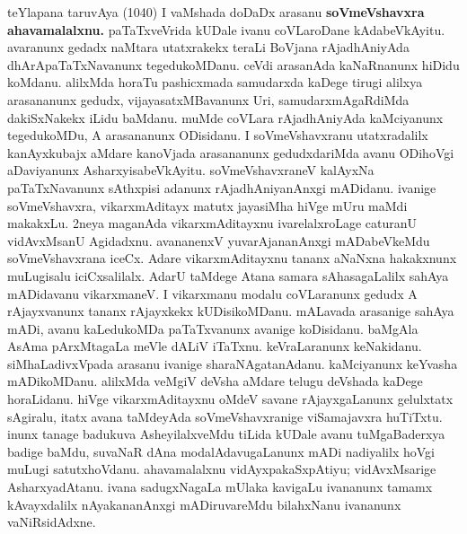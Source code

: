 \documentclass[11pt,a4size]{article}
\begin{document}
teYlapana taruvAya (1040) I vaMshada doDaDx arasanu
\textbf{soVmeVshavxra ahavamalalxnu.} paTaTxveVrida kUDale ivanu
coVLaroDane kAdabeVkAyitu. avaranunx gedadx naMtara utatxrakekx teraLi
BoVjana rAjadhAniyAda dhArApaTaTxNavanunx tegedukoMDanu. ceVdi
arasanAda kaNaRnanunx hiDidu koMdanu. alilxMda horaTu pashicxmada
samudarxda kaDege tirugi alilxya arasananunx gedudx,
vijayasatxMBavanunx Uri, samudarxmAgaRdiMda dakiSxNakekx iLidu
baMdanu. muMde coVLara rAjadhAniyAda kaMciyanunx tegedukoMDu, A
arasananunx ODisidanu. I soVmeVshavxranu utatxradalilx kanAyxkubajx
aMdare kanoVjada arasananunx gedudxdariMda avanu ODihoVgi aDaviyanunx
AsharxyisabeVkAyitu. soVmeVshavxraneV kalAyxNa paTaTxNavanunx
sAthxpisi adanunx rAjadhAniyanAnxgi mADidanu. ivanige soVmeVshavxra,
vikarxmAditayx matutx jayasiMha hiVge mUru maMdi makakxLu. 2neya
maganAda vikarxmAditayxnu ivarelalxroLage caturanU vidAvxMsanU
Agidadxnu. avananenxV yuvarAjananAnxgi mADabeVkeMdu soVmeVshavxrana
iceCx. Adare vikarxmAditayxnu tananx aNaNxna hakakxnunx muLugisalu
iciCxsalilalx. AdarU taMdege Atana samara sAhasagaLalilx sahAya
mADidavanu vikarxmaneV. I vikarxmanu modalu coVLaranunx gedudx A
rAjayxvanunx tananx rAjayxkekx kUDisikoMDanu. mALavada arasanige
sahAya mADi, avanu kaLedukoMDa paTaTxvanunx avanige
koDisidanu. baMgAla AsAma pArxMtagaLa meVle dALiV
iTaTxnu. keVraLaranunx keNakidanu. siMhaLadivxVpada arasanu ivanige
sharaNAgatanAdanu. kaMciyanunx keYvasha mADikoMDanu. alilxMda veMgiV
deVsha aMdare telugu deVshada kaDege horaLidanu. hiVge
vikarxmAditayxnu oMdeV savane rAjayxgaLanunx gelulxtatx sAgiralu,
itatx avana taMdeyAda soVmeVshavxranige viSamajavxra huTiTxtu. inunx
tanage badukuva AsheyilalxveMdu tiLida kUDale avanu tuMgaBaderxya
badige baMdu, suvaNaR dAna modalAdavugaLanunx mADi nadiyalilx hoVgi
muLugi satutxhoVdanu. ahavamalalxnu vidAyxpakaSxpAtiyu; vidAvxMsarige
AsharxyadAtanu. ivana sadugxNagaLa mUlaka kavigaLu ivananunx tamamx
kAvayxdalilx nAyakananAnxgi mADiruvareMdu bilahxNanu ivananunx
vaNiRsidAdxne. 
\end{document}
